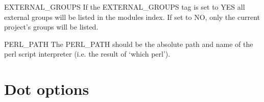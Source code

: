 \begin{DoxyDescription}
\item[{\ttfamily EXTERNAL\_\-GROUPS} ] If the {\ttfamily EXTERNAL\_\-GROUPS} tag is set to {\ttfamily YES} all external groups will be listed in the modules index. If set to {\ttfamily NO}, only the current project's groups will be listed.

\label{config_cfg_perl_path}
\hypertarget{config_cfg_perl_path}{}
 
\item[{\ttfamily PERL\_\-PATH} ] The {\ttfamily PERL\_\-PATH} should be the absolute path and name of the perl script interpreter (i.e. the result of `{\ttfamily which perl}').


\end{DoxyDescription}\hypertarget{config_config_dot}{}\section{Dot options}\label{config_config_dot}
\label{config_cfg_class_diagrams}
\hypertarget{config_cfg_class_diagrams}{}
 
